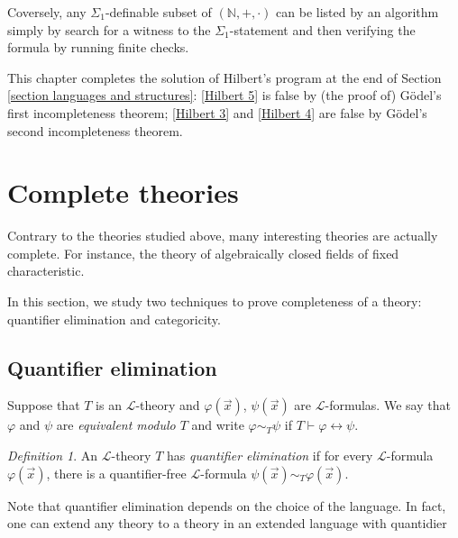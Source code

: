 \documentclass[a4paper, 11pt]{amsart}
\theoremstyle{remark}
\newtheorem{definition}[definition]{Definition}
\newcommand{\NN}{\mathbb{N}}
\newcommand{\cL}{\mathcal L}
\begin{document}
Coversely, any $\Sigma_1$-definable subset of $(\NN,+,\cdot)$ can be listed by an algorithm simply by search for a witness to the $\Sigma_1$-statement and then verifying the formula by running finite checks. 



This chapter completes the solution of Hilbert's program at the end of Section \ref{section languages and structures}: 
\ref{Hilbert 5} is false by (the proof of) G\"odel's first incompleteness theorem; 
\ref{Hilbert 3} and \ref{Hilbert 4} are false by G\"odel's second incompleteness theorem. 









\newpage 

\section{Complete theories} 


Contrary to the theories studied above, many interesting theories are actually complete. 
For instance, the theory of algebraically closed fields of fixed characteristic. 

In this section, we study two techniques to prove completeness of a theory: quantifier elimination and categoricity. 




\subsection{Quantifier elimination} 

Suppose that $T$ is an $\cL$-theory and $\varphi(\vec{x})$, $\psi(\vec{x})$ are $\cL$-formulas. We say that $\varphi$ and $\psi$ are \emph{equivalent modulo $T$} and write $\varphi\sim_T \psi$ if $T\vdash \varphi \leftrightarrow \psi$. 

\begin{definition} 
An $\cL$-theory $T$ has \emph{quantifier elimination} if for every $\cL$-formula $\varphi(\vec{x})$, there is a quantifier-free $\cL$-formula $\psi(\vec{x}) \sim_T  \varphi(\vec{x})$. 
\end{definition} 

Note that quantifier elimination depends on the choice of the language. 
In fact, one can extend any theory to a theory in an extended language with quantidier 
\end{document}
